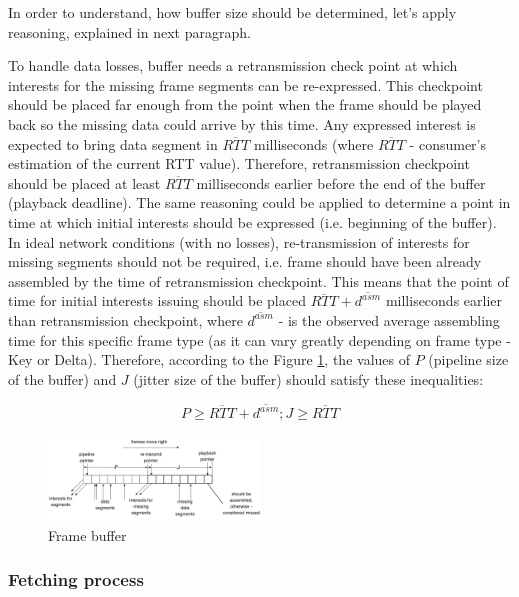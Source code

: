 \documentclass[10pt]{proc}
\begin{document}
In order to understand, how buffer size should be determined, let's apply reasoning, explained in next paragraph.

To handle data losses, buffer needs a retransmission check point at which interests for the missing frame segments can be re-expressed. This checkpoint should be placed far enough from the point when the frame should be played back so the missing data could arrive by this time. Any expressed interest is expected to bring data segment in $\overline{RTT}$ milliseconds (where $\overline{RTT}$ - consumer's estimation of the current RTT value). Therefore, retransmission checkpoint should be placed at least $\overline{RTT}$ milliseconds earlier before the end of the buffer (playback deadline). The same reasoning could be applied to determine a point in time at which initial interests should be expressed (i.e. beginning of the buffer). In ideal network conditions (with no losses), re-transmission of interests for missing segments should not be required, i.e.  frame should have been already assembled by the time of retransmission checkpoint. This means that the point of time for initial interests issuing should be placed $\overline{RTT}+\overline{d^{asm}}$ milliseconds earlier than retransmission checkpoint, where $\overline{d^{asm}}$ - is the observed average assembling time for this specific frame type (as it can vary greatly depending on frame type - Key or Delta). Therefore, according to the Figure \ref{fig:buffer}, the values of $P$ (pipeline size of the buffer) and $J$ (jitter size of the buffer) should satisfy these inequalities:

\begin{equation}
P \geq \overline{RTT} + \overline{d^{asm}}; J \geq \overline{RTT}
\end{equation}


\begin{figure}[Ht!]
\centering
\includegraphics[width=0.5\textwidth]{buffer}
\caption{Frame buffer}
\label{fig:buffer}
\end{figure} 

\subsubsection{Fetching process}
\end{document}

